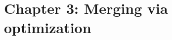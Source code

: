 \documentclass[thesis.tex]{subfiles}
\begin{document}
\chapter{Chapter 3: Merging via optimization}
\end{document}

